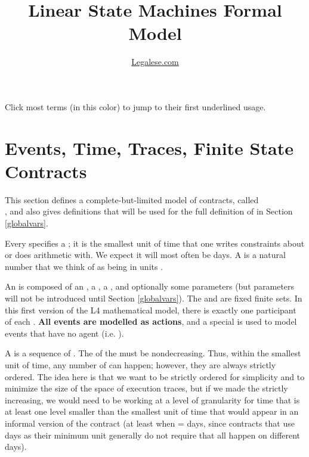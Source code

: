 \documentclass[12pt]{article}
\author{\href{https://legalese.com}{Legalese.com}}
\title{Linear State Machines Formal Model}
\begin{document}
\maketitle



\noindent Click most terms (in \color{TermColor}this color\color{black}) to jump to their first underlined usage.

\tableofcontents



\section{Events, Time, Traces, Finite State Contracts} \label{basics}

This section defines a complete-but-limited model of contracts, called \\ , and also gives definitions that will be used for the full definition of  in Section \ref{globalvars}.

Every \Contract specifies a ; it is the smallest unit of time that one writes constraints about or does arithmetic with. We expect it will most often be days. A  is a natural number that we think of as being in units \TimeUnit.

An  is composed of an , a , a \TimeStamp, and optionally some parameters (but parameters will not be introduced until Section \ref{globalvars}). The \Actions and \Roles are fixed finite sets. In this first version of the L4 mathematical model, there is exactly one participant of each \Role.
{\bf All events are modelled as actions}, and a special \Role {}  is used to model events that have no agent (i.e. \Role).

A  is a sequence of \Events. The \TimeStamps of the \Events must be nondecreasing. Thus, within the smallest unit of time, any number of \Events can happen; however, they are always strictly ordered. The idea here is that we want \Events to be strictly ordered for simplicity and to minimize the size of the space of execution traces, but if we made the \TimeStamps strictly increasing, we would need to be working at a level of granularity for time that is at least one level smaller than the smallest unit of time that would appear in an informal version of the contract (at least when \TimeUnit = days, since contracts that use days as their minimum unit generally do not require that all \Events happen on different days).
\end{document}
